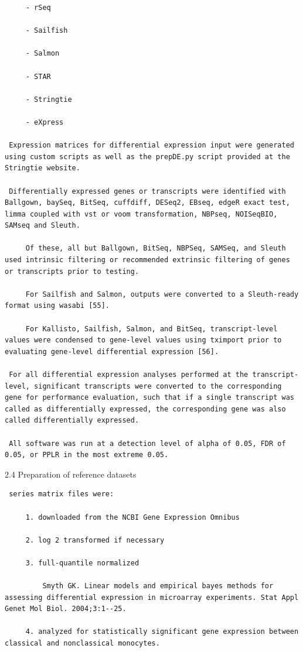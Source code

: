 \documentclass[
]{book}
\begin{document}
\begin{enumerate}
\begin{verbatim}
     - rSeq

     - Sailfish

     - Salmon

     - STAR

     - Stringtie

     - eXpress

 Expression matrices for differential expression input were generated using custom scripts as well as the prepDE.py script provided at the Stringtie website.

 Differentially expressed genes or transcripts were identified with Ballgown, baySeq, BitSeq, cuffdiff, DESeq2, EBseq, edgeR exact test, limma coupled with vst or voom transformation, NBPseq, NOISeqBIO, SAMseq and Sleuth.

     Of these, all but Ballgown, BitSeq, NBPSeq, SAMSeq, and Sleuth used intrinsic filtering or recommended extrinsic filtering of genes or transcripts prior to testing.

     For Sailfish and Salmon, outputs were converted to a Sleuth-ready format using wasabi [55].

     For Kallisto, Sailfish, Salmon, and BitSeq, transcript-level values were condensed to gene-level values using tximport prior to evaluating gene-level differential expression [56].

 For all differential expression analyses performed at the transcript-level, significant transcripts were converted to the corresponding gene for performance evaluation, such that if a single transcript was called as differentially expressed, the corresponding gene was also called differentially expressed.

 All software was run at a detection level of alpha of 0.05, FDR of 0.05, or PPLR in the most extreme 0.05.
\end{verbatim}

  2.4 Preparation of reference datasets

\begin{verbatim}
 series matrix files were:

     1. downloaded from the NCBI Gene Expression Omnibus

     2. log 2 transformed if necessary

     3. full-quantile normalized

         Smyth GK. Linear models and empirical bayes methods for assessing differential expression in microarray experiments. Stat Appl Genet Mol Biol. 2004;3:1--25.

     4. analyzed for statistically significant gene expression between classical and nonclassical monocytes.


\end{verbatim}
\end{enumerate}
\end{document}
